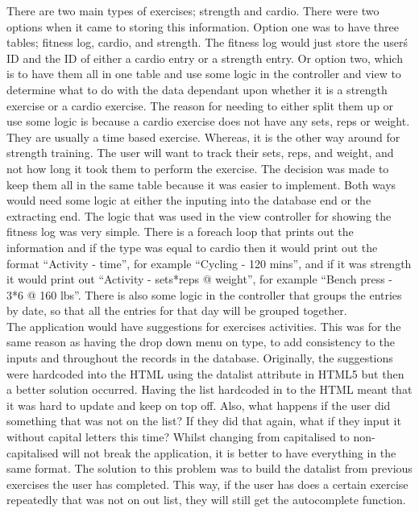 There are two main types of exercises; strength and cardio. There were two options when it came to storing this information. Option one was to have three tables; fitness log, cardio, and strength. The fitness log would just store the user\'s ID and the ID of either a cardio entry or a strength entry. Or option two, which is to have them all in one table and use some logic in the controller and view to determine what to do with the data dependant upon whether it is a strength exercise or a cardio exercise. The reason for needing to either split them up or use some logic is because a cardio exercise does not have any sets, reps or weight. They are usually a time based exercise. Whereas, it is the other way around for strength training. The user will want to track their sets, reps, and weight, and not how long it took them to perform the exercise. The decision was made to keep them all in the same table because it was easier to implement. Both ways would need some logic at either the inputing into the database end or the extracting end. The logic that was used in the view controller for showing the fitness log was very simple. There is a foreach loop that prints out the information and if the type was equal to cardio then it would print out the format ``Activity - time'', for example ``Cycling - 120 mins'', and if it was strength it would print out ``Activity - sets*reps @ weight'', for example ``Bench press - 3*6 @ 160 lbs''. There is also some logic in the controller that groups the entries by date, so that all the entries for that day will be grouped together.\\

The application would have suggestions for exercises activities. This was for the same reason as having the drop down menu on type, to add consistency to the inputs and throughout the records in the database. Originally, the suggestions were hardcoded into the HTML using the datalist attribute in HTML5 but then a better solution occurred. Having the list hardcoded in to the HTML meant that it was hard to update and keep on top off. Also, what happens if the user did something that was not on the list? If they did that again, what if they input it without capital letters this time? Whilst changing from capitalised to non-capitalised will not break the application, it is better to have everything in the same format. The solution to this problem was to build the datalist from previous exercises the user has completed. This way, if the user has does a certain exercise repeatedly that was not on out list, they will still get the autocomplete function.\\

